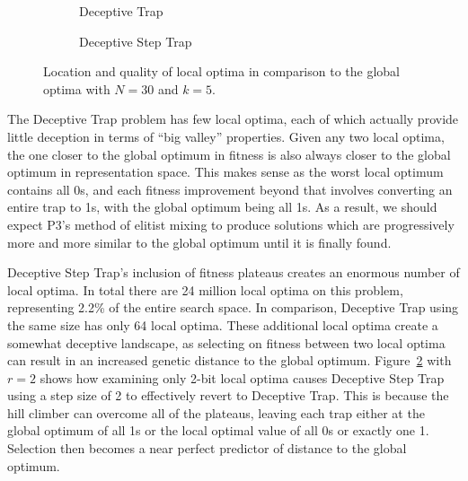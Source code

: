 \begin{figure}[t]
  \begin{centering}
    \begin{subfigure}{.44\textwidth}
      \begin{centering}
      \end{centering}
      \caption{Deceptive Trap}
      \label{fig-valley-dt}
    \end{subfigure}%
    \begin{subfigure}{.56\textwidth}
      \begin{centering}
      \end{centering}
      \caption{Deceptive Step Trap}
      \label{fig-valley-dst}
    \end{subfigure}
  \end{centering}
  \caption{Location and quality of local optima in comparison to the global optima with $N=30$ and $k=5$.}
  \label{fig-valley-trap}
\end{figure}

The Deceptive Trap problem has few local optima, each of which actually
provide little deception in terms of ``big valley'' properties. Given any two local optima, the one
closer to the global optimum in fitness is also always closer to the global optimum in representation space.
This makes sense as the worst local optimum contains all 0s, and each fitness improvement beyond that involves
converting an entire trap to 1s, with the global optimum being all 1s. As a result, we should expect P3's method
of elitist mixing to produce solutions which are progressively more and more similar to the global optimum until
it is finally found.

Deceptive Step Trap's inclusion of fitness plateaus creates an enormous number of local optima. In total there are 24
million local optima on this problem, representing 2.2\% of the entire search space. In comparison, Deceptive Trap using the
same size has only 64 local optima. These additional local optima create a somewhat deceptive landscape, as selecting
on fitness between two local optima can result in an increased genetic distance to the global optimum.
Figure~\ref{fig-valley-dst} with $r=2$ shows how examining only 2-bit local optima causes Deceptive Step Trap using
a step size of 2 to effectively revert to Deceptive Trap. This is because the hill climber can overcome all of the plateaus,
leaving each trap either at the global optimum of all 1s or the local optimal value of all 0s or exactly one 1. Selection then
becomes a near perfect predictor of distance to the global optimum.

